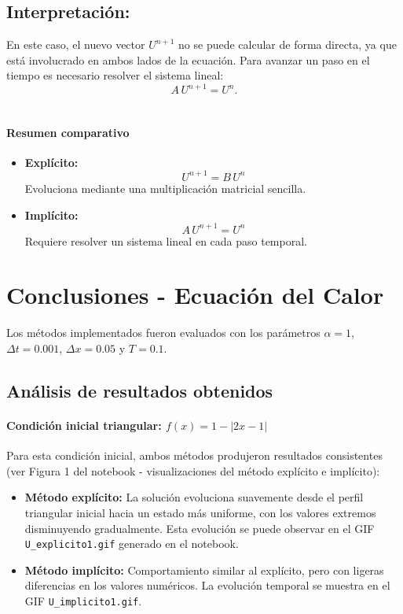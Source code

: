 \documentclass[12pt,a4paper]{article}
\begin{document}
\subsection*{Interpretación:} 
En este caso, el nuevo vector \(U^{n+1}\) no se puede calcular de forma directa, ya que está involucrado en ambos lados de la ecuación.  
Para avanzar un paso en el tiempo es necesario resolver el sistema lineal:
\[
A\,U^{n+1} = U^n.
\] \\

\paragraph{Resumen comparativo}

\begin{itemize}
    \item \textbf{Explícito:}  
    \[
    U^{n+1} = B\,U^n
    \]
    Evoluciona mediante una multiplicación matricial sencilla.
    
    \item \textbf{Implícito:}  
    \[
    A\,U^{n+1} = U^n
    \]
    Requiere resolver un sistema lineal en cada paso temporal.
\end{itemize}

\section{Conclusiones - Ecuación del Calor}

Los métodos implementados fueron evaluados con los parámetros $\alpha = 1$, $\Delta t = 0.001$, $\Delta x = 0.05$ y $T = 0.1$.

\subsection{Análisis de resultados obtenidos}

\paragraph{Condición inicial triangular: $f(x) = 1 - |2x - 1|$}

Para esta condición inicial, ambos métodos produjeron resultados consistentes (ver Figura 1 del notebook - visualizaciones del método explícito e implícito):

\begin{itemize}
    \item \textbf{Método explícito:} La solución evoluciona suavemente desde el perfil triangular inicial hacia un estado más uniforme, con los valores extremos disminuyendo gradualmente. Esta evolución se puede observar en el GIF \texttt{U\_explicito1.gif} generado en el notebook.
    \item \textbf{Método implícito:} Comportamiento similar al explícito, pero con ligeras diferencias en los valores numéricos. La evolución temporal se muestra en el GIF \texttt{U\_implicito1.gif}.
\end{itemize}
\end{document}
